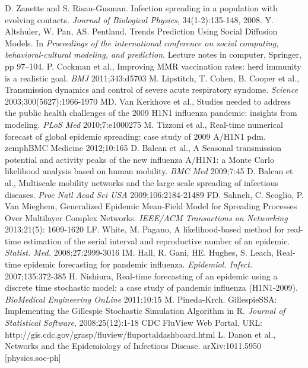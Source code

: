 \documentclass[11pt, a4paper, oneside,titlepage]{article}
\begin{document}
\begin{thebibliography}{1}
	D. Zanette and S. Risau-Gusman. Infection spreading in a population with evolving contacts. \emph{Journal of Biological Physics}, 34(1-2):135-148, 2008.
	Y. Altshuler, W. Pan, AS. Pentland. Trends Prediction Using Social Diffusion Models. In \emph{Proceedings of the international conference on social computing, behavioral-cultural modeling, and prediction}. Lecture notes in computer, Springer, pp 97–104.
	P. Cockman et al., Improving MMR vaccination rates: herd immunity is a realistic goal. \emph{BMJ} 2011;343:d5703
	M. Lipstitch, T. Cohen, B. Cooper et al., Transmission dynamics and control of severe acute respiratory syndome. \emph{Science} 2003;300(5627):1966-1970
	MD. Van Kerkhove et al., Studies needed to address the public health challenges of the 2009 H1N1 influenza pandemic: insights from modeling. \emph{PLoS Med} 2010;7:e1000275
	M. Tizzoni et al., Real-time numerical forecast of global epidemic spreading: case study of 2009 A/H1N1 pdm. zemph{BMC Medicine} 2012;10:165
	D. Balcan et al., A Seasonal transmission potential and activity peaks of the new influenza A/H1N1: a Monte Carlo likelihood analysis based on human mobility. \emph{BMC Med} 2009;7:45
	D. Balcan et al., Multiscale mobility networks and the large scale spreading of infectious diseases. \emph{Proc Natl Acad Sci USA} 2009;106:2184-21489
	FD. Sahneh, C. Scoglio, P. Van Mieghem, Generalized Epidemic Mean-Field Model for Spreading Processes Over Multilayer Complex Networks. \emph{IEEE/ACM Transactions on Networking} 2013;21(5): 1609-1620
LF. White, M. Pagano, A likelihood-based method for real-time estimation of the serial interval and reproductive number of an epidemic. \emph{Statist. Med.} 2008;27:2999-3016
IM. Hall, R. Gani, HE. Hughes, S. Leach, Real-time epidemic forecasting for pandemic influenza. \emph{Epidemiol. Infect.} 2007;135:372-385
H. Nishiura, Real-time forecasting of an epidemic using a discrete time stochastic model: a case study of pandemic influenza (H1N1-2009). \emph{BioMedical Engineering OnLine} 2011;10:15
	M. Pineda-Krch. GillespieSSA: Implementing the Gillespie Stochastic Simulation Algorithm in R. \emph{Journal of Statistical Software}, 2008;25(12):1-18
	CDC FluView Web Portal. URL: http://gis.cdc.gov/grasp/fluview/fluportaldashboard.html
	L. Danon et al., Networks and the Epidemiology of Infectious
        Disease. arXiv:1011.5950 [physics.soc-ph]

\end{thebibliography}
\end{document}
